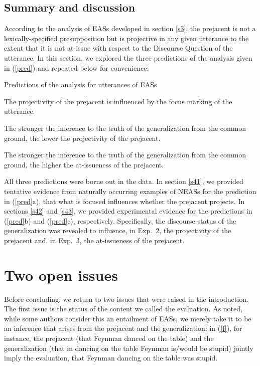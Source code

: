 \documentclass[11pt,fleqn]{article}
\newcommand{\6}{\mbox{$[\hspace*{-.6mm}[$}}
\newcommand{\9}{\mbox{$]\hspace*{-.6mm}]$}}
\begin{document}
\subsection{Summary and discussion}

According to the analysis of EASs developed in section \ref{s3}, the prejacent is not a lexically-specified presupposition but is projective in any given utterance to the extent that it is not at-issue with respect to the Discourse Question of the utterance. In this section, we explored the three predictions of the analysis given in (\ref{pred}) and repeated below for convenience:

\begin{exe}
\exi{(\ref{pred})} Predictions of the analysis for utterances of EASs

\begin{xlist}

\ex The projectivity of the prejacent is influenced by the focus marking of the utterance.

\ex The stronger the inference to the truth of the generalization from the common ground, the lower the projectivity of the prejacent.

\ex The stronger the inference to the truth of the generalization from the common ground, the higher the at-issueness of the prejacent. 

\end{xlist}
\end{exe}
All three predictions were borne out in the data. In section \ref{s41}, we provided tentative evidence from naturally occurring examples of NEASs for the prediction in (\ref{pred}a), that what is focused influences whether the prejacent projects. In sections \ref{s42} and \ref{s43}, we provided experimental evidence for the predictions in (\ref{pred}b) and (\ref{pred}c), respectively. Specifically, the discourse status of the generalization was revealed to influence, in Exp.~2, the projectivity of the prejacent and, in Exp.~3, the at-issueness of the prejacent. 

\section{Two open issues}\label{s5}

Before concluding, we return to two issues that were raised in the introduction. The first issue is the status of the content we called the evaluation. As noted, while some authors consider this an entailment of EASs, we merely take it to be an inference that arises from the prejacent and the generalization: in (\ref{f}), for instance, the prejacent (that Feynman danced on the table) and the generalization (that in dancing on the table Feynman is/would be stupid) jointly imply the evaluation, that Feynman dancing on the table was stupid. 
\end{document}
